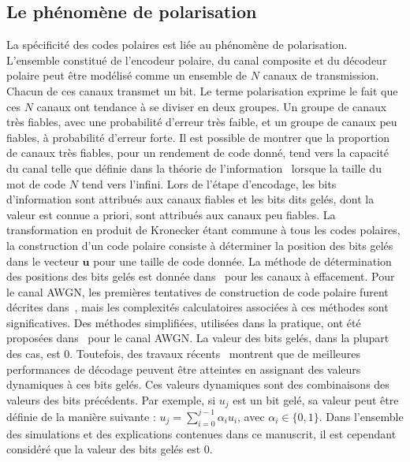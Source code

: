 \subsection{Le phénomène de polarisation}
\label{subsec:polarisation}
La spécificité des codes polaires est liée au phénomène de polarisation. L'ensemble constitué de l'encodeur polaire, du canal composite et du décodeur polaire peut être modélisé comme un ensemble de $N$ canaux de transmission. Chacun de ces canaux transmet un bit. Le terme \og polarisation \fg exprime le fait que ces $N$ canaux ont tendance à se diviser en deux groupes. Un groupe de canaux très fiables, avec une probabilité d'erreur très faible, et un groupe de canaux peu fiables, à probabilité d'erreur forte.
Il est possible de montrer que la proportion de canaux très fiables, pour un rendement de code donné, tend vers la capacité du canal telle que définie dans la théorie de l'information~\cite{shannon_mathematical_2001} lorsque la taille du mot de code $N$ tend vers l'infini.
Lors de l'étape d'encodage, les bits d'information sont attribués aux canaux fiables et les bits dits gelés, dont la valeur est connue a priori, sont attribués aux canaux peu fiables. La transformation en produit de Kronecker étant commune à tous les codes polaires, la construction d'un code polaire consiste à déterminer la position des bits gelés dans le vecteur $\mathbold{u}$ pour une taille de code donnée. La méthode de détermination des positions des bits gelés est donnée dans~\cite{arikan_channel_2009} pour les canaux à effacement. Pour le canal AWGN, les premières tentatives de construction de code polaire furent décrites dans~\cite{mori_performance_2009,mori_properties_2010}, mais les complexités calculatoires associées à ces méthodes sont significatives. Des méthodes simplifiées, utilisées dans la pratique, ont été proposées dans~\cite{tal_how_2013,trifonov_efficient_2012,trifonov_randomized_2018} pour le canal AWGN. La valeur des bits gelés, dans la plupart des cas, est 0. Toutefois, des travaux récents~\cite{trifonov_polar_2016,trifonov_randomized_2017} montrent que de meilleures performances de décodage peuvent être atteintes en assignant des valeurs dynamiques à ces bits gelés. Ces valeurs dynamiques sont des combinaisons des valeurs des bits précédents. Par exemple, si $u_j$ est un bit gelé, sa valeur peut être définie de la manière suivante : $u_j=\sum^{j-1}_{i=0} \alpha_i u_i$, avec $\alpha_i \in \{0,1\}$. Dans l'ensemble des simulations et des explications contenues dans ce manuscrit, il est cependant considéré que la valeur des bits gelés est 0.

